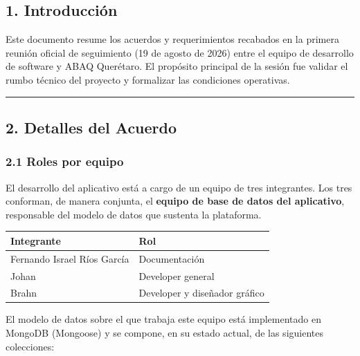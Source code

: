 \documentclass[
]{article}
\newcounter{none} %
\begin{document}
\subsection{1. Introducción}\label{introducciuxf3n}

Este documento resume los acuerdos y requerimientos recabados en la
primera reunión oficial de seguimiento (19 de agosto de 2026) entre el
equipo de desarrollo de software y ABAQ Querétaro. El propósito
principal de la sesión fue validar el rumbo técnico del proyecto y
formalizar las condiciones operativas.

\begin{center}\rule{0.5\linewidth}{0.5pt}\end{center}

\subsection{2. Detalles del Acuerdo}\label{detalles-del-acuerdo}

\subsubsection{2.1 Roles por equipo}\label{roles-por-equipo}

El desarrollo del aplicativo está a cargo de un equipo de tres
integrantes. Los tres conforman, de manera conjunta, el \textbf{equipo
de base de datos del aplicativo}, responsable del modelo de datos que
sustenta la plataforma.

{\def\LTcaptype{none} %
\begin{longtable}[]{@{}ll@{}}
\toprule\noalign{}
Integrante & Rol \\
\midrule\noalign{}
\endhead
\bottomrule\noalign{}
\endlastfoot
Fernando Israel Ríos García & Documentación \\
Johan & Developer general \\
Brahn & Developer y diseñador gráfico \\
\end{longtable}
}

El modelo de datos sobre el que trabaja este equipo está implementado en
MongoDB (Mongoose) y se compone, en su estado actual, de las siguientes
colecciones:
\end{document}
